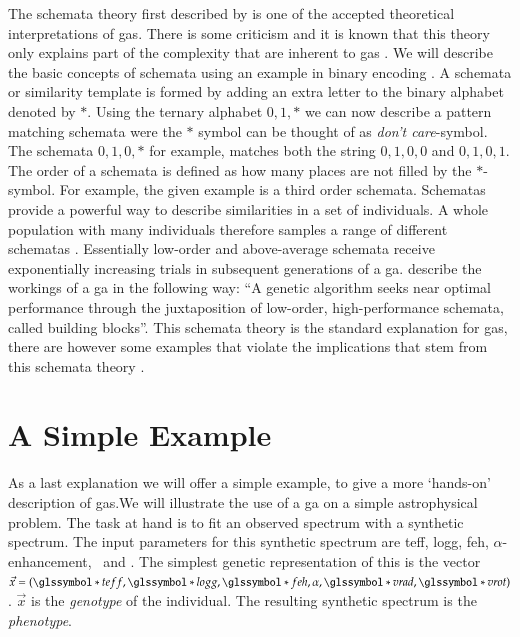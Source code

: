 The schemata theory first described by \cite{holland1975} is one of the accepted theoretical interpretations of \glspl{ga}. There is some criticism and it is known that this theory only explains part of the complexity that are inherent to \glspl{ga} \citep[see ][ and references therein]{Whitley94agenetic}. We will describe the basic concepts of schemata using an example in binary encoding \citep[notation adapted from ][]{citeulike:125978}. A schemata or similarity template is formed by adding an extra letter to the binary alphabet denoted by $*$. Using the ternary alphabet ${0, 1, *}$ we can now describe a pattern matching schemata were the $*$ symbol can be thought of as \textit{don't care}-symbol. The schemata ${0, 1, 0, *}$ for example, matches both the string ${0, 1, 0, 0}$ and ${0, 1, 0, 1}$. The order of a schemata is defined as how many places are not filled by the $*$-symbol. For example, the given example is a third order schemata. Schematas provide a powerful way to describe similarities in a set of \glspl{individual}. 
A whole population with many \glspl{individual} therefore samples a range of different schematas . Essentially low-order and above-average schemata receive exponentially increasing trials in subsequent generations of a \gls{ga}. \citet{Michalewicz:1994:GAD:184675} describe the workings of a \gls{ga} in the following way: ``A genetic algorithm seeks near optimal performance through the juxtaposition of low-order, high-performance schemata, called building blocks''.
This schemata theory is the standard explanation for \glspl{ga}, there are however some examples that violate the implications that stem from this schemata theory \citep[see Chapter 3 of][for some examples]{Michalewicz:1994:GAD:184675}.

\section{A Simple Example}

As a last explanation we will offer a simple example, to give a more `hands-on' description of \glspl{ga}.We will illustrate the use of a \gls{ga} on a simple astrophysical problem. The task at hand is to fit an observed spectrum with a synthetic spectrum. The input parameters for this synthetic spectrum are \gls{teff}, \gls{logg}, \gls{feh}, $\alpha$-enhancement, \vrad\ and \vrot. The simplest genetic representation of this is the vector $\vec{x} = (\teff, \logg, \feh, \alpha, \vrad, \vrot)$. $\vec{x}$ is the \textit{genotype} of the individual. The resulting synthetic spectrum is the \textit{phenotype}. 

